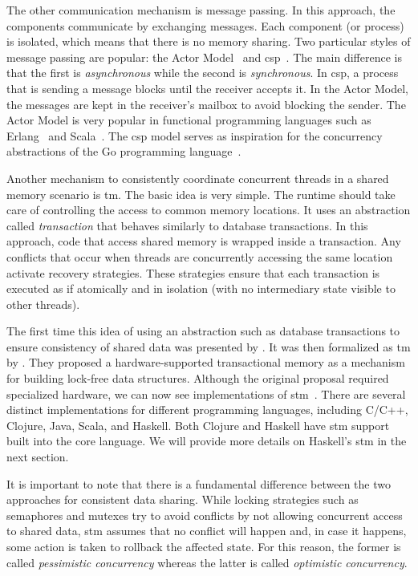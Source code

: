 The other communication mechanism is message passing. In this approach, the components communicate by exchanging messages. Each component (or process) is isolated, which means that there is no memory sharing. Two particular styles of message passing are popular: the Actor Model~\cite{agha:1986} and \ac{csp}~\cite{hoare:1978}. The main difference is that the first is \emph{asynchronous} while the second is \emph{synchronous}. In \acs{csp}, a process that is sending a message blocks until the receiver accepts it. In the Actor Model, the messages are kept in the receiver's mailbox to avoid blocking the sender. The Actor Model is very popular in functional programming languages such as Erlang~\cite{armstrong:2007} and Scala~\cite{haller:2009}. The \acs{csp} model serves as inspiration for the concurrency abstractions of the Go programming language~\cite{pike:2012}.

Another mechanism to consistently coordinate concurrent threads in a shared memory scenario is \ac{tm}. The basic idea is very simple. The runtime should take care of controlling the access to common memory locations. It uses an abstraction called \emph{transaction} that behaves similarly to database transactions. In this approach, code that access shared memory is wrapped inside a transaction. Any conflicts that occur when threads are concurrently accessing the same location activate recovery strategies. These strategies ensure that each transaction is executed as if atomically and in isolation (with no intermediary state visible to other threads).

The first time this idea of using an abstraction such as database transactions to ensure consistency of shared data was presented by . It was then formalized as \acl{tm} by . They proposed a hardware-supported transactional memory as a mechanism for building lock-free data structures. Although the original proposal required specialized hardware, we can now see implementations of \ac{stm}~\cite{shavit:1995}. There are several distinct implementations for different programming languages, including C/C++, Clojure, Java, Scala, and Haskell. Both Clojure and Haskell have  \acs{stm} support built into the core language. We will provide more details on Haskell's \acs{stm} in the next section.

It is important to note that there is a fundamental difference between the two approaches for consistent data sharing. While locking strategies such as semaphores and mutexes try to avoid conflicts by not allowing concurrent access to shared data, \acs{stm} assumes that no conflict will happen and, in case it happens, some action is taken to rollback the affected state. For this reason, the former is called \emph{pessimistic concurrency} whereas the latter is called \emph{optimistic concurrency}.


